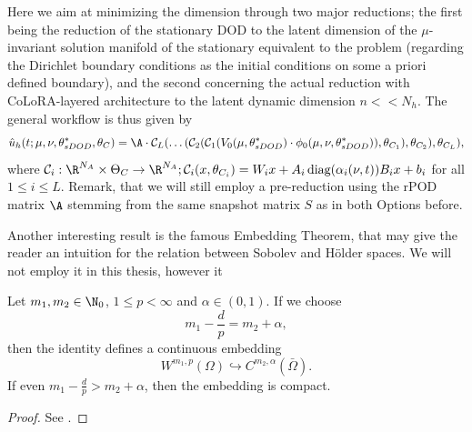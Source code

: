 Here we aim at minimizing the dimension through two major reductions; the first being the reduction of the stationary DOD to the latent dimension of the $\mu$-invariant solution manifold of the stationary equivalent to the problem (regarding the Dirichlet boundary conditions as the initial conditions on some a priori defined boundary), and the second concerning the actual reduction with CoLoRA-layered architecture to the latent dynamic dimension $n << N_h$. The general workflow is thus given by 
\begin{equation}
    \hat{u}_h(t; \mu, \nu, \theta^*_{sDOD}, \theta_{C}) = \A \cdot \mathcal{C}_L( \dots (\mathcal{C}_2(\mathcal{C}_1(V_0(\mu, \theta^*_{sDOD}) \cdot \phi_0(\mu, \nu, \theta^*_{sDOD})), \theta_{C_1}), \theta_{C_2}), \theta_{C_L}),
\end{equation}
where $\mathcal{C}_i: \R^{N_A} \times \Theta_C \to \R^{N_A}; \mathcal{C}_i(x, \theta_{C_i}) = W_i x + A_i \, \text{diag}(\alpha_i(\nu, t)) B_i x + b_i$ for all $1 \leq i \leq L.$
Remark, that we will still employ a pre-reduction using the rPOD matrix $\A$ stemming from the same snapshot matrix $S$ as in both Options before.






Another interesting result is the famous Embedding Theorem, that may give the reader an intuition for
the relation between Sobolev and Hölder spaces. We will not employ it in this thesis, however it 

\begin{theorem}
    Let $m_1, m_2 \in \N_0$, $1 \leq p < \infty$ and $\alpha \in (0, 1)$. If we choose 
    \begin{equation*}
        m_1 - \frac{d}{p} = m_2 + \alpha,
    \end{equation*}
    then the identity defines a continuous embedding
    \begin{equation*}
        W^{m_1, p}(\Omega) \hookrightarrow C^{m_2, \alpha}(\bar{\Omega}).
    \end{equation*}
    If even $m_1 - \frac{d}{p} > m_2 + \alpha$, then the embedding is compact.
\end{theorem}
\begin{proof}
    See \cite[p. 10-13]{alt2016}.
\end{proof}





